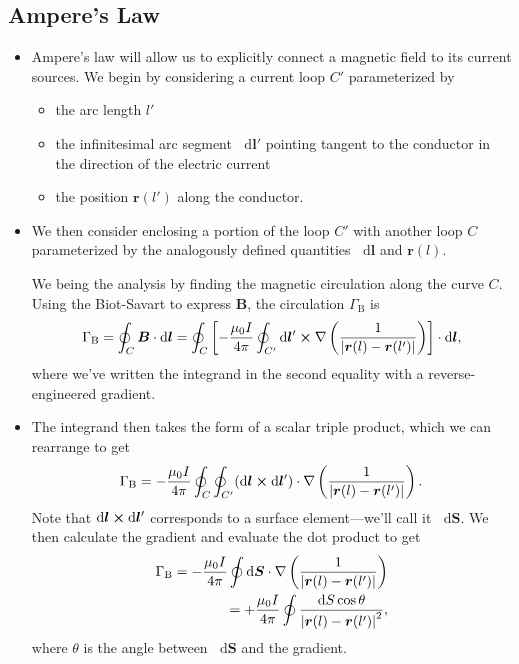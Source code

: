\documentclass[11pt, a4paper]{article}
\newcommand{\diff}{\mathop{}\!\mathrm{d}} %
\renewcommand{\vec}[1]{\bm{#1}} %
\renewcommand{\r}{\vec{r}}
\newcommand{\B}{\vec{B}} %
\newcommand{\mm}{\mu_{0}}  %
\renewcommand{\j}{\vec{j}}  %
\renewcommand{\curl}{\nabla \cross}
\renewcommand{\grad}{\nabla}
\begin{document}
\subsection{Ampere's Law}
\begin{itemize}
	\item Ampere's law will allow us to explicitly connect a magnetic field to its current sources. We begin by considering a current loop $ C' $ parameterized by
    \begin{itemize}
        \item the arc length $ l' $

        \item the infinitesimal arc segment $ \diff \vec{l}' $ pointing tangent to the conductor in the direction of the electric current

        \item the position $ \r(l')  $ along the conductor.
    \end{itemize}

	\item We then consider enclosing a portion of the loop $ C' $ with another  loop $ C $ parameterized by the analogously defined quantities $ \diff \vec{l} $ and $ \r(l) $.
	
	
	We being the analysis by finding the magnetic circulation along the curve $ C $. Using the Biot-Savart to express $ \B $, the circulation $ \Gamma_{\text{B}} $ is
	\begin{equation*}
		\Gamma_{\text{B}} = \oint_{C} \B \cdot \diff \vec{l} = \oint_{C}\left[ - \frac{\mm I}{4 \pi} \oint_{C'}\diff \vec{l}' \cross \grad \left(\frac{1}{\abs{\r(l) - \r(l')}}\right) \right] \cdot \diff \vec{l},
	\end{equation*}
	where we've written the integrand in the second equality with a reverse-engineered gradient. 

    \item The integrand then takes the form of a scalar triple product, which we can rearrange to get
	\begin{equation*}
		\Gamma_{\text{B}} =  - \frac{\mm I}{4\pi} \oint_{C} \oint_{C'} (\diff \vec{l} \cross \diff \vec{l}') \cdot \grad \left(\frac{1}{\abs{\r(l) - \r(l')}}\right).
	\end{equation*}
	Note that $ \diff \vec{l} \cross \diff \vec{l}' $ corresponds to a surface element---we'll call it $ \diff \vec{S} $. We then calculate the gradient and evaluate the dot product to get
	\begin{align*}
		\Gamma_{\text{B}} =  - \frac{\mm I}{4\pi} \oint \diff \vec{S}\cdot \grad \left(\frac{1}{\abs{\r(l) - \r(l')}}\right) \\
		= +  \frac{\mm I}{4\pi} \oint  \frac{\diff S \cos \theta}{\abs{\r(l) - \r(l')}^{2}},
	\end{align*}
	where $ \theta $ is the angle between $ \diff \vec{S} $ and the gradient. 


\end{itemize}
\end{document}
